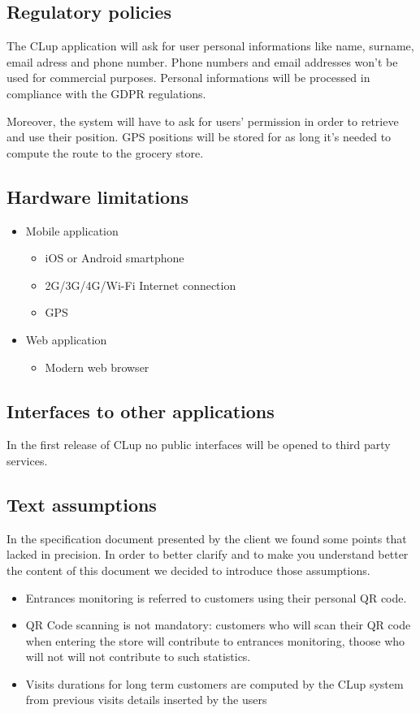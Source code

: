\subsection{Regulatory policies}
The CLup application will ask for user personal informations like name, surname, email adress and phone number. Phone numbers and email addresses won't be used for commercial purposes.
Personal informations will be processed in compliance with the GDPR regulations.

Moreover, the system will have to ask for users' permission in order to retrieve and use their position. GPS positions will be stored for as long it's needed to compute the route to the grocery store.

\subsection{Hardware limitations}
\label{hardware limitations}
\begin{itemize}
    \item Mobile application
    \begin{itemize}
        \item iOS or Android smartphone
        \item 2G/3G/4G/Wi-Fi Internet connection
        \item GPS
    \end{itemize}
    \item Web application
    \begin{itemize}
        \item Modern web browser
    \end{itemize}
\end{itemize}

\subsection{Interfaces to other applications}
In the first release of CLup no public interfaces will be opened to third party services.

\subsection{Text assumptions}
In the specification document presented by the client we found some points that lacked in precision. In order to better clarify and to make you understand better the content of this document we decided to introduce those assumptions.
\begin{itemize}
    \item Entrances monitoring is referred to customers using their personal QR code.
    \item QR Code scanning is not mandatory: customers who will scan their QR code when entering the store will contribute to entrances monitoring, thoose who will not will not contribute to such statistics.
    \item Visits durations for long term customers are computed by the CLup system from previous visits details inserted by the users
\end{itemize}

